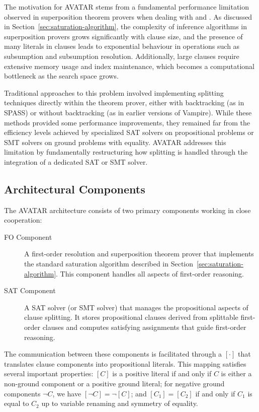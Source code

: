 The motivation for AVATAR stems from a fundamental performance limitation observed in superposition theorem provers when dealing with  and .
As discussed in Section~\ref{sec:saturation-algorithm}, the complexity of inference algorithms in superposition provers grows significantly with clause size, and the presence of many literals in clauses leads to exponential behaviour in operations such as subsumption and subsumption resolution.
Additionally, large clauses require extensive memory usage and index maintenance, which becomes a computational bottleneck as the search space grows.

Traditional approaches to this problem involved implementing splitting techniques directly within the theorem prover, either with backtracking (as in SPASS) or without backtracking (as in earlier versions of Vampire).
While these methods provided some performance improvements, they remained far from the efficiency levels achieved by specialized SAT solvers on propositional problems or SMT solvers on ground problems with equality.
AVATAR addresses this limitation by fundamentally restructuring how splitting is handled through the integration of a dedicated SAT or SMT solver.

\subsection{Architectural Components}\label{subsec:avatar-components}

The AVATAR architecture consists of two primary components working in close cooperation:

\begin{description}
  \item[FO Component] A first-order resolution and superposition theorem prover that implements the standard saturation algorithm described in Section~\ref{sec:saturation-algorithm}.
                     This component handles all aspects of first-order reasoning.
  \item[SAT Component] A SAT solver (or SMT solver) that manages the propositional aspects of clause splitting.
                       It stores propositional clauses derived from splittable first-order clauses and computes satisfying assignments that guide first-order reasoning.
\end{description}
The communication between these components is facilitated through a  \([\cdot]\) that translates clause components into propositional literals.
This mapping satisfies several important properties: \([C]\) is a positive literal if and only if \(C\) is either a non-ground component or a positive ground literal; for negative ground components \(\neg C\), we have \([\neg C] = \neg[C]\); and \([C_1] = [C_2]\) if and only if \(C_1\) is equal to \(C_2\) up to variable renaming and symmetry of equality.

